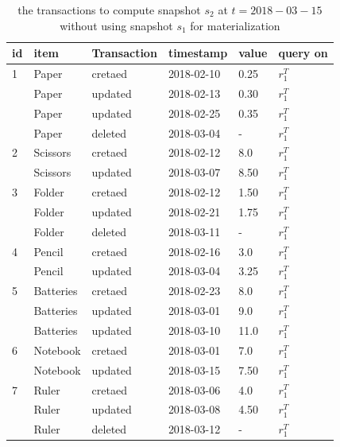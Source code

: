 			\begin{center}
			\begin{table}
				\centering
				\caption{the transactions to compute snapshot $s_2$ at $t = 2018-03-15$ without using snapshot $s_1$ for materialization}
				\label{table:transactions_nonmaterialized}
				\begin{tabular}{p{1cm}p{2cm}p{2cm}p{3cm}p{2cm}p{2cm}}
					\hline
					id & item & Transaction  &timestamp & value  &query on\\ \hline
					1 & Paper & cretaed & 2018-02-10 & 0.25 & $r_1^T$ \\
					  & Paper & updated & 2018-02-13 & 0.30 & $r_1^T$ \\
					  & Paper & updated & 2018-02-25 & 0.35 & $r_1^T$ \\
					  & Paper & deleted & 2018-03-04 & - & $r_1^T$ \\ \hline
					2 & Scissors & cretaed & 2018-02-12 & 8.0 & $r_1^T$ \\
					  & Scissors & updated & 2018-03-07 & 8.50 & $r_1^T$ \\ \hline
					3 & Folder & cretaed & 2018-02-12 & 1.50 & $r_1^T$ \\
					  & Folder & updated & 2018-02-21 & 1.75 & $r_1^T$ \\
					  & Folder & deleted & 2018-03-11 & - & $r_1^T$ \\ \hline
				  	4 & Pencil & cretaed & 2018-02-16 & 3.0 & $r_1^T$ \\
					  & Pencil & updated & 2018-03-04 & 3.25 & $r_1^T$ \\ \hline
			  	  	5 & Batteries & cretaed & 2018-02-23 & 8.0 & $r_1^T$ \\
					  & Batteries & updated & 2018-03-01 & 9.0 & $r_1^T$ \\
					  & Batteries & updated & 2018-03-10 & 11.0 & $r_1^T$ \\ \hline
					6 & Notebook & cretaed & 2018-03-01 & 7.0 & $r_1^T$ \\ 
					  & Notebook & updated & 2018-03-15 & 7.50 & $r_1^T$ \\ \hline
					7 & Ruler & cretaed & 2018-03-06 & 4.0 & $r_1^T$ \\
					  & Ruler & updated & 2018-03-08 & 4.50 & $r_1^T$ \\
					  & Ruler & deleted & 2018-03-12 & - & $r_1^T$ \\ \hline

				\end{tabular}
			\end{table}
			\end{center}

